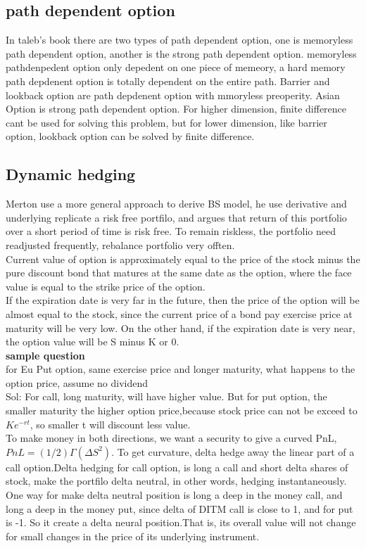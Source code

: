 \documentclass[a4paper,11pt]{article}
\begin{document}
\subsection{path dependent option}
In taleb's book there are two types of path dependent option, one is memoryless path dependent option, another is the strong path dependent option. memoryless pathdenpedent option only depedent on one piece of memeory, a hard memory path depdenent option is totally dependent on the entire path. Barrier and lookback option are path depdenent option with mmoryless preoperity. Asian Option is strong path dependent option. For higher dimension, finite difference cant be used for solving this problem, but for lower dimension, like barrier option, lookback option can be solved by finite difference.

\subsection{Dynamic hedging}
Merton use a more general approach to derive BS model, he use derivative and underlying replicate a risk free portfilo, and argues that return of this portfolio over a short period of time is risk free. To remain riskless, the portfolio need readjusted frequently, rebalance portfolio very offten.\\

Current value of option is approximately equal to the price of the stock minus the pure discount bond that matures at the same date as the option, where the face value is equal to the strike price of the option. \\
If the expiration date is very far in the future, then the price of the option will be almost equal to the stock, since the current price of a bond pay exercise price at maturity will be very low. On the other hand, if the expiration date is very near, the option value will be S minus K or 0.\\
{\bf sample question}\\
for Eu Put option, same exercise price and longer maturity, what happens to the option price, assume no dividend\\
Sol: For call, long maturity, will have higher value. But for put option, the smaller maturity the higher option price,because stock price can not be exceed to $Ke^{-rt}$, so smaller t will discount less value.\\
To make money in both directions, we want a security to give a curved PnL, $PnL=(1/2)\Gamma (\Delta S^2)$. To get curvature, delta hedge away the linear part of a call option.Delta hedging for call option, is long a call and short delta shares of stock, make the portfilo delta neutral, in other words, hedging instantaneously. One way for make delta neutral position is long a deep in the money call, and long a deep in the money put, since delta of DITM call is close to 1, and for put is -1. So it create a delta neural position.That is, its overall value will not change for small changes in the price of its underlying instrument.
\end{document}
